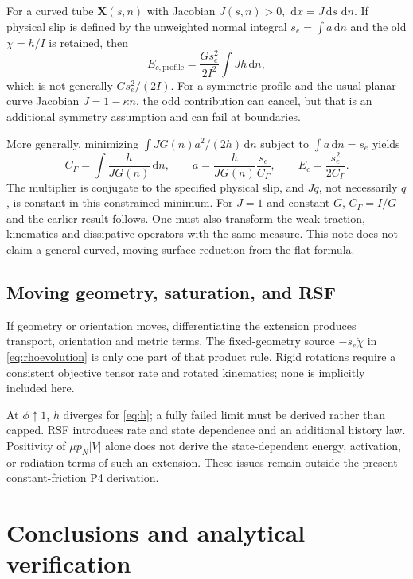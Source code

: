 \documentclass[11pt,a4paper]{article}
\numberwithin{equation}{section}
\newcommand{\dd}{\,\mathrm d}
\begin{document}
For a curved tube $\bm X(s,n)$ with Jacobian $J(s,n)>0$,
$\dd x=J\dd s\,\dd n$.
If physical slip is defined by the unweighted normal integral
$s_e=\int a\dd n$ and the old $\chi=h/I$ is retained, then
\begin{equation}
 E_{c,\mathrm{profile}}
 =\frac{G s_e^2}{2I^2}\int J h\dd n ,
\end{equation}
which is not generally $G s_e^2/(2I)$.
For a symmetric profile and the usual planar-curve Jacobian
$J=1-\kappa n$, the odd contribution can cancel, but that is an additional
symmetry assumption and can fail at boundaries.

More generally, minimizing $\int JG(n)a^2/(2h)\dd n$ subject to
$\int a\dd n=s_e$ yields
\begin{equation}
 C_\Gamma=\int\frac{h}{J G(n)}\dd n,\qquad
 a=\frac{h}{J G(n)}\frac{s_e}{C_\Gamma},\qquad
 E_c=\frac{s_e^2}{2C_\Gamma}.
 \label{eq:curved}
\end{equation}
The multiplier is conjugate to the specified physical slip, and $Jq$,
not necessarily $q$, is constant in this constrained minimum.
For $J=1$ and constant $G$, $C_\Gamma=I/G$ and the earlier result follows.
One must also transform the weak traction, kinematics and dissipative
operators with the same measure. This note does not claim a general curved,
moving-surface reduction from the flat formula.

\subsection{Moving geometry, saturation, and RSF}

If geometry or orientation moves, differentiating the extension produces
transport, orientation and metric terms. The fixed-geometry source
$-s_e\dot\chi$ in \eqref{eq:rhoevolution} is only one part of that product rule.
Rigid rotations require a consistent objective tensor rate and rotated
kinematics; none is implicitly included here.

At $\phi\uparrow1$, $h$ diverges for \eqref{eq:h}; a fully failed limit must
be derived rather than capped. RSF introduces rate and state dependence and
an additional history law. Positivity of $\mu p_N|V|$ alone does not derive
the state-dependent energy, activation, or radiation terms of such an
extension. These issues remain outside the present constant-friction P4
derivation.

\section{Conclusions and analytical verification}
\end{document}
